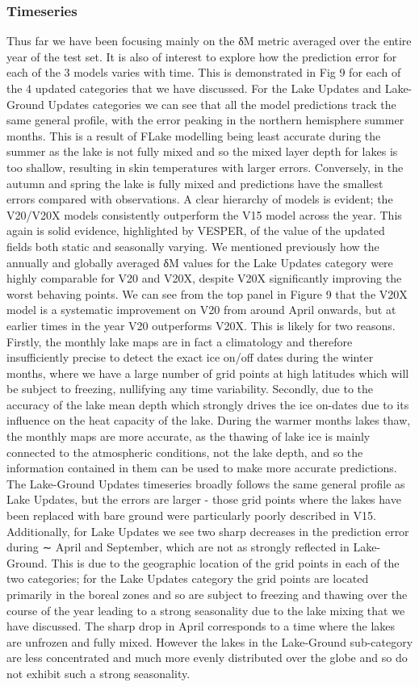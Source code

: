 \documentclass[hess, manuscript]{copernicus}
\begin{document}
\subsubsection{Timeseries}
Thus far we have been focusing mainly on the δM metric averaged over the entire year of the test set. It is also of interest to explore how the prediction error for each of the 3 models varies with time. This is demonstrated in Fig 9 for each of the 4 updated categories that we have discussed.
For the Lake Updates and Lake-Ground Updates categories we can see that all the model predictions track the same general profile, with the error peaking in the northern hemisphere summer months. This is a result of FLake modelling being least accurate during the summer as the lake is not fully mixed and so the mixed layer depth for lakes is too shallow, resulting in skin temperatures with larger errors. Conversely, in the autumn and spring the lake is fully mixed and predictions have the smallest errors compared with observations. A clear hierarchy of models is evident; the V20/V20X models consistently outperform the V15 model across the year. This again is solid evidence, highlighted by VESPER, of the value of the updated fields both static and seasonally varying. We mentioned previously how the annually and globally averaged δM values for the Lake Updates category were highly comparable for V20 and V20X, despite V20X significantly improving the worst behaving points. We can see from the top panel in Figure 9 that the V20X model is a systematic improvement on V20 from around April onwards, but at earlier times in the year V20 outperforms V20X. This is likely for two reasons. Firstly, the monthly lake maps are in fact a climatology and therefore insufficiently precise to detect the exact ice on/off dates during the winter months, where we have a large number of grid points at high latitudes which will be subject to freezing, nullifying any time variability. Secondly, due to the accuracy of the lake mean depth which strongly drives the ice on-dates due to its influence on the heat capacity of the lake. During the warmer months lakes thaw, the monthly maps are more accurate, as the thawing of lake ice is mainly connected to the atmospheric conditions, not the lake depth, and so the information contained in them can be used to make more accurate predictions. The Lake-Ground Updates timeseries broadly follows the same general profile as Lake Updates, but the errors are larger - those grid points where the lakes have been replaced with bare ground were particularly poorly described in V15. Additionally, for Lake Updates we see two sharp decreases in the prediction error during ∼ April and September, which are not as strongly reflected in Lake-Ground. This is due to the geographic location of the grid points in each of the two categories; for the Lake Updates category the grid points are located primarily in the boreal zones and so are subject to freezing and thawing over the course of the year leading to a strong seasonality due to the lake mixing that we have discussed. The sharp drop in April corresponds to a time where the lakes are unfrozen and fully mixed. However the lakes in the Lake-Ground sub-category are less concentrated and much more evenly distributed over the globe and so do not exhibit such a strong seasonality.
\end{document}
